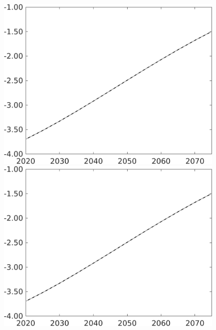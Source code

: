 \documentclass[12pt]{article}
\begin{document}
\begin{figure}[h!!]
\begin{minipage}[]{0.32\textwidth}
\end{minipage}	
\begin{minipage}[]{0.32\textwidth}
\includegraphics[width=1\textwidth]{../../codding_model/own_basedOnFried/optimalPol_010922_revision/figures/all_13Sept22/PerdifNoTauf_Equlab_regime0_CompTaul_pg_spillover0_nsk1_xgr1_knspil1_sep1_LFlimit0_emsbase0_countec0_GovRev0_etaa0.79_lgd0.png}
\end{minipage}	
\begin{minipage}[]{0.32\textwidth}
\includegraphics[width=1\textwidth]{../../codding_model/own_basedOnFried/optimalPol_010922_revision/figures/all_13Sept22/PerdifNoTauf_Equlab_regime0_CompTaul_pn_spillover0_nsk1_xgr1_knspil1_sep1_LFlimit0_emsbase0_countec0_GovRev0_etaa0.79_lgd0.png}

\end{minipage}
\end{figure}
\end{document}
